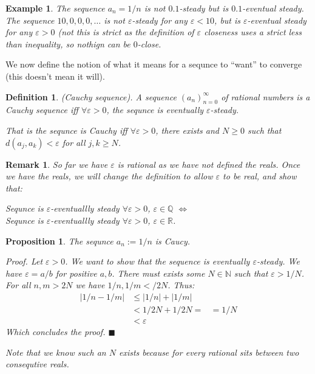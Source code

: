 \documentclass{article}
\newtheorem{example}{Example}[subsection]
\newtheorem{definition}{Definition}[subsection]
\newtheorem{remark}{Remark}[subsection]
\newtheorem{proposition}{Proposition}[subsection]
\newcommand{\R}{\mathbb{R}}
\newcommand{\Q}{\mathbb{Q}}
\newcommand{\N}{\mathbb{N}}
\newcommand{\vep}{\varepsilon} %
\let\it\textit
\begin{document}
\begin{example}
	The sequence $a_n = 1/n$ is not $0.1$-steady but is $0.1$-eventual 
	steady.	The sequence $10, 0, 0,0, \dots$ is not $\vep$-steady 
	for any $\vep < 10$, but is $\vep$-eventual steady for any
	$\vep > 0$ (not this is strict as the definition of $\vep$ 
	closeness uses a strict less than inequality, so nothign 
	can be $0$-close.
\end{example}

We now define the notion of what it means for a sequnce to ``want'' 
to converge (this doesn't mean it will).

\begin{definition}
\label{cauchy-sequence-rational}
	(Cauchy sequence). A sequence $(a_n)_{n=0}^\infty$ of rational
	numbers is a Cauchy sequence iff $\forall \vep > 0$, the
	sequnce is eventually $\vep$-steady.

	That is the sequnce is Cauchy iff $\forall \vep > 0$, there
	exists and $N\geq 0$ such that $d(a_j, a_k) < \vep$ for all
	$j,k \geq N$.
\end{definition}

\begin{remark}
	So far we have $\vep$ is rational as we have not defined 
	the reals. Once we have the reals, we will change 
	the definition to allow $\vep$ to be real, and show 
	that:
	\begin{center}
		Sequnce is $\vep$-eventuallly steady $\forall \vep > 0$,
		$\vep \in \Q$ $\iff$ \\
		Sequnce is $\vep$-eventuallly steady $\forall \vep > 0$,
		$\vep \in \R$.
	\end{center}
\end{remark}

\begin{proposition}
	The sequnce $a_n := 1/n$ is Caucy.

	\it{Proof}. Let $\vep > 0$. We want to show that the sequence
	is eventually $\vep$-steady. We have $\vep = a/b$ for positive 
	$a,b$. There must exists some $N \in \N$ such that $\vep > 1/N$.
	For all $n,m > 2N$ we have $1/n, 1/m < /2N$. Thus:
	\begin{align*}
		|1/n - 1/m| &\leq |1/n| + |1/m| \\
			    &< 1/2N + 1/2N = 
			    &=1/N \\
			    &< \vep
	\end{align*}
	Which concludes the proof. \hfill $\blacksquare$

	Note that we know such an $N$ exists because for every rational sits 
	between two consequtive reals.
\end{proposition}
\end{document}
